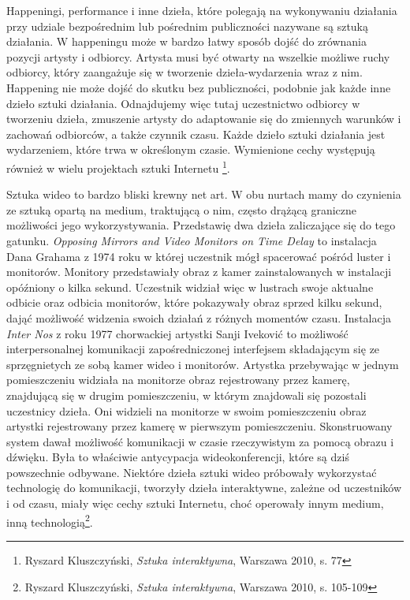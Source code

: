 \documentclass[a4paper,12pt,twoside]{article}
\begin{document}
Happeningi, performance i inne dzieła, które polegają na wykonywaniu
działania przy udziale bezpośrednim lub pośrednim publiczności
nazywane są sztuką działania. W happeningu może w bardzo łatwy sposób
dojść do zrównania pozycji artysty i odbiorcy. Artysta musi być otwarty
na wszelkie możliwe ruchy odbiorcy, który zaangażuje się w tworzenie
dzieła-wydarzenia wraz z nim. Happening nie może dojść do skutku
bez publiczności, podobnie jak każde inne dzieło sztuki działania.
Odnajdujemy więc tutaj uczestnictwo odbiorcy w tworzeniu dzieła,
zmuszenie artysty do adaptowanie się do zmiennych warunków i zachowań
odbiorców, a także czynnik czasu. Każde dzieło sztuki działania
jest wydarzeniem, które trwa w określonym czasie. Wymienione cechy
występują również w wielu projektach sztuki Internetu
\footnote{Ryszard Kluszczyński, \textit{Sztuka interaktywna},
Warszawa 2010, s. 77}.

Sztuka wideo to bardzo bliski krewny net art. W obu nurtach mamy do czynienia
ze sztuką opartą na medium, traktującą o nim, często drążącą graniczne
możliwości jego wykorzystywania. Przedstawię dwa dzieła zaliczające się
do tego gatunku. \textit{Opposing Mirrors and Video Monitors on Time Delay}
to instalacja Dana Grahama z 1974 roku w której uczestnik mógł spacerować
pośród luster i monitorów. Monitory przedstawiały obraz z kamer zainstalowanych
w instalacji opóźniony o kilka sekund. Uczestnik widział więc w lustrach
swoje aktualne odbicie oraz odbicia monitorów, które pokazywały obraz sprzed
kilku sekund, dająć możliwość widzenia swoich działań z różnych momentów czasu.
Instalacja \textit{Inter Nos} z roku 1977 chorwackiej artystki Sanji Iveković
to możliwość interpersonalnej komunikacji zapośredniczonej interfejsem
składającym się ze sprzęgnietych ze sobą kamer wideo i monitorów. Artystka
przebywając w jednym pomieszczeniu widziała na monitorze obraz rejestrowany
przez kamerę, znajdującą się w drugim pomieszczeniu, w którym znajdowali
się pozostali uczestnicy dzieła. Oni widzieli na monitorze w swoim
pomieszczeniu obraz artystki rejestrowany przez kamerę w pierwszym
pomieszczeniu. Skonstruowany system dawał możliwość komunikacji
w czasie rzeczywistym za pomocą obrazu i dźwięku. Była to właściwie
antycypacja wideokonferencji, które są dziś powszechnie odbywane.
Niektóre dzieła sztuki wideo próbowały wykorzystać technologię do
komunikacji, tworzyły dzieła interaktywne, zależne od uczestników
i od czasu, miały więc cechy sztuki Internetu, choć operowały innym medium,
inną technologią\footnote{Ryszard Kluszczyński, \textit{Sztuka interaktywna},
Warszawa 2010, s. 105-109}.
\end{document}
